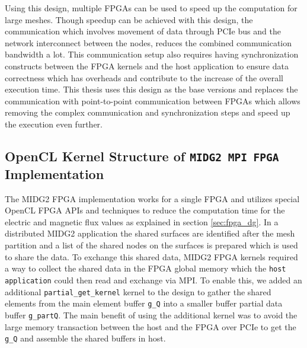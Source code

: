 Using this design, multiple FPGAs can be used to speed up the computation for large meshes.
Though speedup can be achieved with this design, the communication which involves
movement of data through PCIe bus and the network interconnect between the nodes,
reduces the combined communication bandwidth a lot. This communication setup also
requires having synchronization constructs between the FPGA kernels and the host
application to ensure data correctness which has overheads and contribute to the increase
of the overall execution time. This thesis uses this design as the base versions and replaces
the communication with point-to-point communication between FPGAs which allows
removing the complex communication and synchronization steps and speed up the
execution even further.

\subsection{OpenCL Kernel Structure of \texttt{MIDG2 MPI FPGA} Implementation}
\label{sec:midge_mpi_struc}

The MIDG2 FPGA implementation works for a single FPGA and utilizes special OpenCL FPGA
APIs and techniques to reduce the computation time for the electric and magnetic flux values
as explained in section \ref{sec:fpga_dg}. In a distributed MIDG2 application the shared
surfaces are identified after the mesh partition and a list of the shared nodes on the
surfaces is prepared which is used to share the data.
To exchange this shared data, MIDG2 FPGA kernels required a way to collect the shared
data in the FPGA global memory which the \texttt{host application} could then read and
exchange via MPI. To enable this, we added an additional \texttt{partial\_get\_kernel}
kernel to the design to gather the shared elements from
the main element buffer \texttt{g\_Q} into a smaller buffer partial data buffer \texttt{g\_partQ}.
The main benefit of using the additional kernel was to avoid the large memory transaction between the
host and the FPGA over PCIe to get the \texttt{g\_Q} and assemble the shared buffers in host.


